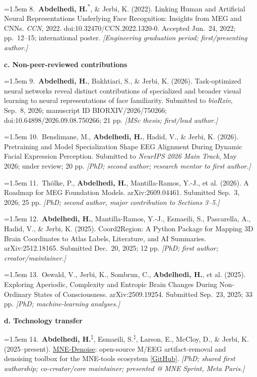 \documentclass[12pt,letterpaper]{article}
\newcommand{\presenting}{\textsuperscript{*}}
\newcommand{\sharedfirst}{\textsuperscript{\ensuremath{\ddagger}}}
\newcommand{\nsercsubheading}[1]{%
  \Needspace{2\baselineskip}%
  \vspace{3pt}%
  \noindent\textbf{#1}\par\vspace{0pt}%
}
\newcommand{\nsercitem}[2]{%
  \noindent\hangindent=1.5em\hangafter=1 #1 \textit{[#2]}\par%
  \vspace{0pt}%
}
\begin{document}
\nsercitem{8.~\textbf{Abdelhedi, H.}\presenting, \& Jerbi, K. (2022).
  Linking Human and Artificial Neural Representations Underlying Face Recognition:
  Insights from MEG and CNNs. \textit{CCN}, 2022.
  doi:10.32470/CCN.2022.1320-0. Accepted Jun.~24, 2022; pp.~12--15; international poster.}{Engineering
  graduation period; first/presenting author.}

\nsercsubheading{c. Non-peer-reviewed contributions}

\nsercitem{9.~\textbf{Abdelhedi, H.}, Bakhtiari, S., \& Jerbi, K. (2026).
  Task-optimized neural networks reveal distinct contributions of specialized and
  broader visual learning to neural representations of face familiarity.
  Submitted to \textit{bioRxiv}, Sep.~8, 2026; manuscript ID BIORXIV/2026/750266;
  doi:10.64898/2026.09.08.750266; 21 pp.}{MSc thesis; first/lead author.}

\nsercitem{10.~Benslimane, M., \textbf{Abdelhedi, H.}, Hadid, V., \& Jerbi, K. (2026).
  Pretraining and Model Specialization Shape EEG Alignment During Dynamic Facial
  Expression Perception. Submitted to \textit{NeurIPS 2026 Main Track}, May 2026;
  under review; 20 pp.}{PhD; second author; research mentor to first author.}

\nsercitem{11.~Thölke, P., \textbf{Abdelhedi, H.}, Mantilla-Ramos, Y.-J., et al.
  (2026). A Roadmap for MEG Foundation Models. arXiv:2609.04461. Submitted
  Sep.~3, 2026; 25 pp.}{PhD; second author, major contribution to Sections 3--5.}

\nsercitem{12.~\textbf{Abdelhedi, H.}, Mantilla-Ramos, Y.-J., Esmaeili, S.,
  Pascarella, A., Hadid, V., \& Jerbi, K. (2025). Coord2Region: A Python Package for
  Mapping 3D Brain Coordinates to Atlas Labels, Literature, and AI Summaries.
  arXiv:2512.18165. Submitted Dec.~20, 2025; 12 pp.}{PhD; first author; creator/maintainer.}

\nsercitem{13.~Oswald, V., Jerbi, K., Sombrun, C., \textbf{Abdelhedi, H.}, et al.
  (2025). Exploring Aperiodic, Complexity and Entropic Brain Changes During
  Non-Ordinary States of Consciousness. arXiv:2509.19254. Submitted Sep.~23, 2025;
  33 pp.}{PhD; machine-learning analyses.}

\nsercsubheading{d. Technology transfer}

\nsercitem{14.~\textbf{Abdelhedi, H.}\sharedfirst, Esmaeili,
  S.\sharedfirst, Larson, E., McCloy, D., \& Jerbi, K. (2025--present).
  \href{https://github.com/mne-tools/mne-denoise}{MNE-Denoise}: open-source M/EEG
  artifact-removal and denoising toolbox for the MNE-tools ecosystem
  \href{https://github.com/mne-tools/mne-denoise}{[GitHub]}.}{PhD;
  shared first authorship; co-creator/core maintainer; presented @ MNE Sprint, Meta Paris.}
\end{document}
